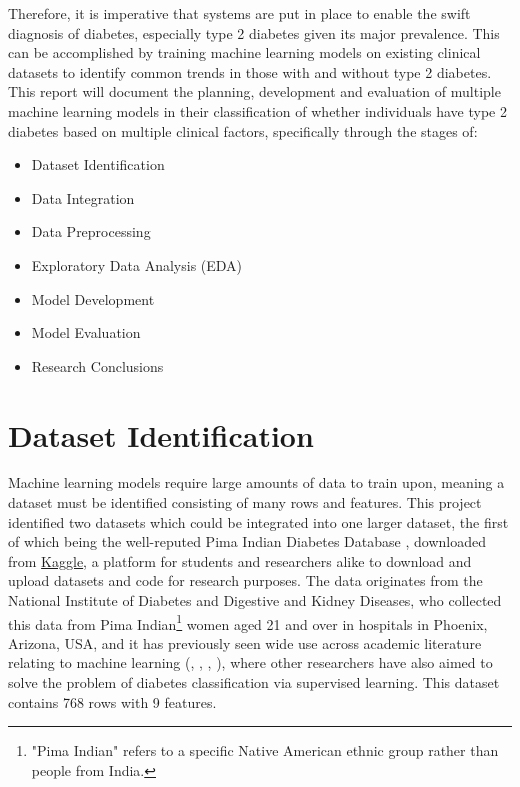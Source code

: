 \documentclass[12pt]{report}
\newcommand{\para}{\vspace{8pt}\noindent}
\begin{document}
\para
Therefore, it is imperative that systems are put in place to enable the swift diagnosis of diabetes, especially type 2 diabetes 
given its major prevalence. This can be accomplished by training machine learning models on existing clinical datasets 
to identify common trends in those with and without type 2 diabetes. This report will document the planning, development 
and evaluation of multiple machine learning models in their classification of whether individuals have type 2 diabetes based 
on multiple clinical factors, specifically through the stages of:

\begin{itemize}
    \item Dataset Identification
    \item Data Integration
    \item Data Preprocessing
    \item Exploratory Data Analysis (EDA)
    \item Model Development 
    \item Model Evaluation
    \item Research Conclusions
\end{itemize}

\pagebreak 
\section{Dataset Identification}

Machine learning models require large amounts of data to train upon, meaning a dataset must be identified consisting of many 
rows and features. This project identified two datasets which could be integrated into one larger dataset, the first of which being 
the well-reputed Pima Indian Diabetes Database \autocite{uci_machine_learning_pima_nodate}, downloaded from \href{https://www.kaggle.com/datasets/uciml/pima-indians-diabetes-database}{Kaggle}, 
a platform for students and researchers alike to download and upload datasets and code for research purposes. The data originates from the National Institute 
of Diabetes and Digestive and Kidney Diseases, who collected this data from Pima Indian\footnote{"Pima Indian" refers to a specific Native American ethnic group rather than people from India.}
women aged 21 and over in hospitals in Phoenix, Arizona, USA, and it has previously seen wide use across academic literature relating to machine learning (\textcite{alzubi_diabetes_2023}, \textcite{zou_construction_2024}, \textcite{joshi_predicting_2021}, \textcite{hayashi_rule_2016}),
where other researchers have also aimed to solve the problem of diabetes classification via supervised learning. This dataset contains 768 rows with 9 features.
\end{document}
